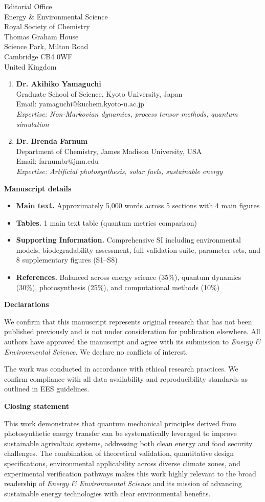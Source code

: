 \documentclass[11pt]{letter}
\begin{document}
\begin{letter}{Editorial Office\\
Energy \& Environmental Science\\
Royal Society of Chemistry\\
Thomas Graham House\\
Science Park, Milton Road\\
Cambridge CB4 0WF\\
United Kingdom}
\begin{enumerate}
\item \textbf{Dr. Akihiko Yamaguchi}\\
Graduate School of Science, Kyoto University, Japan\\
Email: yamaguchi@kuchem.kyoto-u.ac.jp\\
\textit{Expertise: Non-Markovian dynamics, process tensor methods, quantum simulation}

\item \textbf{Dr. Brenda Farnum}\\
Department of Chemistry, James Madison University, USA\\
Email: farnumbr@jmu.edu\\
\textit{Expertise: Artificial photosynthesis, solar fuels, sustainable energy}
\end{enumerate}

\textbf{Manuscript details}

\begin{itemize}
\item \textbf{Main text.} Approximately 5,000 words across 5 sections with 4 main figures
\item \textbf{Tables.} 1 main text table (quantum metrics comparison)
\item \textbf{Supporting Information.} Comprehensive SI including environmental models, biodegradability assessment, full validation suite, parameter sets, and 8 supplementary figures (S1--S8)
\item \textbf{References.} Balanced across energy science (35\%), quantum dynamics (30\%), photosynthesis (25\%), and computational methods (10\%)
\end{itemize}

\textbf{Declarations}

We confirm that this manuscript represents original research that has not been published previously and is not under consideration for publication elsewhere. All authors have approved the manuscript and agree with its submission to \textit{Energy \& Environmental Science}. We declare no conflicts of interest.

The work was conducted in accordance with ethical research practices. We confirm compliance with all data availability and reproducibility standards as outlined in EES guidelines.

\textbf{Closing statement}

This work demonstrates that quantum mechanical principles derived from photosynthetic energy transfer can be systematically leveraged to improve sustainable agrivoltaic systems, addressing both clean energy and food security challenges. The combination of theoretical validation, quantitative design specifications, environmental applicability across diverse climate zones, and experimental verification pathways makes this work highly relevant to the broad readership of \textit{Energy \& Environmental Science} and its mission of advancing sustainable energy technologies with clear environmental benefits.


\end{letter}
\end{document}
